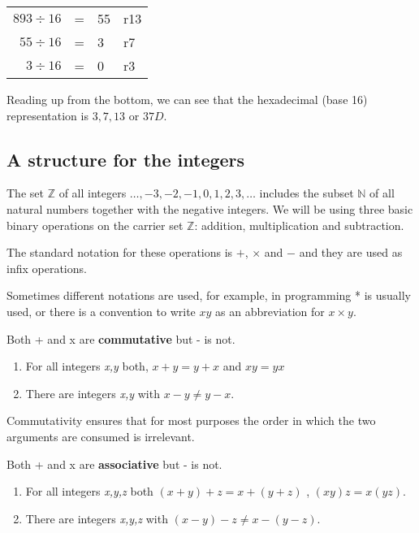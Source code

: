 \documentclass{article}
\begin{document}
\begin{center}
	\begin{tabular} {r l l l }
		$893 \div 16$ & = & 55 & r13\\
		$55 \div 16$ & = & 3 & r7\\
		$3 \div 16$ & = & 0 & r3\\
	\end{tabular}
\end{center}

Reading up from the bottom, we can see that the hexadecimal (base 16) representation is $3,7,13$ or $37D$.

\subsection{A structure for the integers}

The set $\mathbb{Z}$ of all integers $\ldots,-3,-2,-1,0,1,2,3,\ldots$ includes
the subset $\mathbb{N}$ of all natural numbers together with the negative
integers. We will be using three basic binary operations on the carrier set
$\mathbb{Z}$: addition, multiplication and subtraction.

The standard notation for these operations is $+$, $\times$ and $-$ and they are
used as infix operations.

Sometimes different notations are used, for example, in programming * is usually
used, or there is a convention to write $xy$ as an abbreviation for $x \times
y$.
 
Both + and x are {\bf commutative} but - is not.

\begin{enumerate}
\item For all integers {\it x,y} both, $x + y = y + x$ and $xy = yx$
\item There are integers {\it x,y} with $x - y \ne y - x$.
\end{enumerate}

Commutativity ensures that for most purposes the order in which the two arguments are consumed is irrelevant.

Both + and x are {\bf associative} but - is not.

\begin{enumerate}
\item For all integers {\it x,y,z} both $(x + y) + z = x + (y + z)$ , $(xy)z = x(yz)$.
\item There are integers {\it x,y,z} with $(x - y) - z \ne x - (y - z)$.
\end{enumerate}
\end{document}
